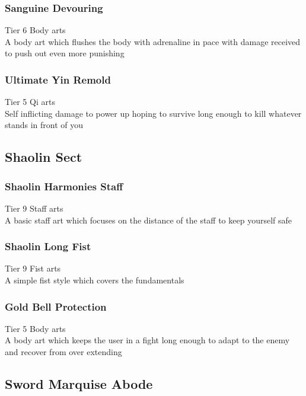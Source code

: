\subsubsection{Sanguine Devouring}
Tier 6 Body arts\\
A body art which flushes the body with adrenaline in pace with damage received to push out even more punishing

\subsubsection{Ultimate Yin Remold}
Tier 5 Qi arts\\
Self inflicting damage to power up hoping to survive long enough to kill whatever stands in front of you

\subsection{Shaolin Sect}
\subsubsection{Shaolin Harmonies Staff}
Tier 9 Staff arts\\
A basic staff art which focuses on the distance of the staff to keep yourself safe

\subsubsection{Shaolin Long Fist}
Tier 9 Fist arts\\
A simple fist style which covers the fundamentals

\subsubsection{Gold Bell Protection}
Tier 5 Body arts\\
A body art which keeps the user in a fight long enough to adapt to the enemy and recover from over extending

\subsection{Sword Marquise Abode} %
\subsubsection{}

\subsubsection{}

